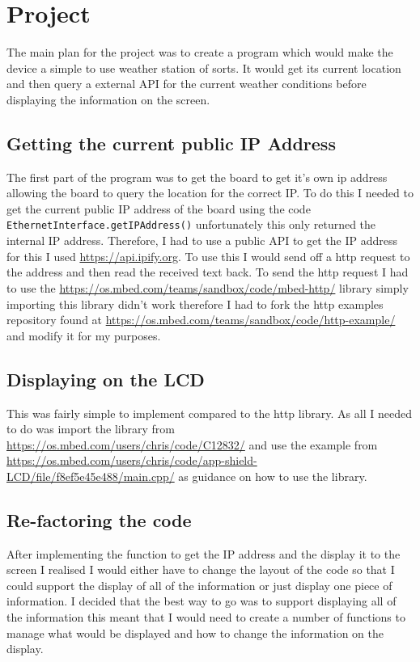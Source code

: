 \documentclass[a4paper,12pt]{scrartcl}
\begin{document}
	\section{Project}
	{
		The main plan for the project was to create a program which would make the device a simple to use weather station of sorts. It would get its current location and then query a external API for the current weather conditions before displaying the information on the screen.
		\subsection{Getting the current public IP Address}
		{
			The first part of the program was to get the board to get it's own ip address allowing the board to query the location for the correct IP. To do this I needed to get the current public IP address of the board using the code \lstinline|EthernetInterface.getIPAddress()| unfortunately this only returned the internal IP address. Therefore, I had to use a public API to get the IP address for this I used \url{https://api.ipify.org}\cite{Degges}. To use this I would send off a http request to the address and then read the received text back. To send the http request I had to use the \url{https://os.mbed.com/teams/sandbox/code/mbed-http/} library simply importing this library didn't work therefore I had to fork the http examples repository found at \url{https://os.mbed.com/teams/sandbox/code/http-example/} and modify it for my purposes.
		}
		\subsection{Displaying on the LCD}
		{
			This was fairly simple to implement compared to the http library. As all I needed to do was import the library from \url{https://os.mbed.com/users/chris/code/C12832/} and use the example from \url{https://os.mbed.com/users/chris/code/app-shield-LCD/file/f8ef5e45e488/main.cpp/} as guidance on how to use the library. 
		}
		\subsection{Re-factoring the code}
		{
			After implementing the function to get the IP address and the display it to the screen I realised I would either have to change the layout of the code so that I could support the display of all of the information or just display one piece of information. I decided that the best way to go was to support displaying all of the information this meant that I would need to create a number of functions to manage what would be displayed and how to change the information on the display.
		}
}
\end{document}
